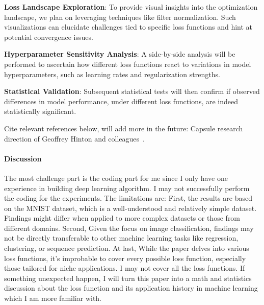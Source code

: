 \documentclass[12pt]{article}
\begin{document}
\textbf{Loss Landscape Exploration}: To provide visual insights into the optimization landscape, we plan on leveraging techniques like filter normalization. Such visualizations can elucidate challenges tied to specific loss functions and hint at potential convergence issues.

\textbf{Hyperparameter Sensitivity Analysis}: A side-by-side analysis will be performed to ascertain how different loss functions react to variations in model hyperparameters, such as learning rates and regularization strengths.

\textbf{Statistical Validation}: Subsequent statistical tests will then confirm if observed differences in model performance, under different loss functions, are indeed statistically significant.

Cite relevant references below, will add more in the future:
Capsule research direction of Geoffrey Hinton and colleagues~\citep[see, e.g.,][]{byerly2020norouting}.


\paragraph{Discussion}
The most challenge part is the coding part for me since I only have one experience in building deep learning algorithm. I may not successfully perform the coding for the experiments. 
The limitations are: 
First, the results are based on the MNIST dataset, which is a well-understood and relatively simple dataset. Findings might differ when applied to more complex datasets or those from different domains.
Second, Given the focus on image classification, findings may not be directly transferable to other machine learning tasks like regression, clustering, or sequence prediction.
At last, While the paper delves into various loss functions, it's improbable to cover every possible loss function, especially those tailored for niche applications. I may not cover all the loss functions.
If something unexpected happen, I will turn this paper into a math and statistics discussion about the loss function and its application history in machine learning which I am more familiar with.



\end{document}
